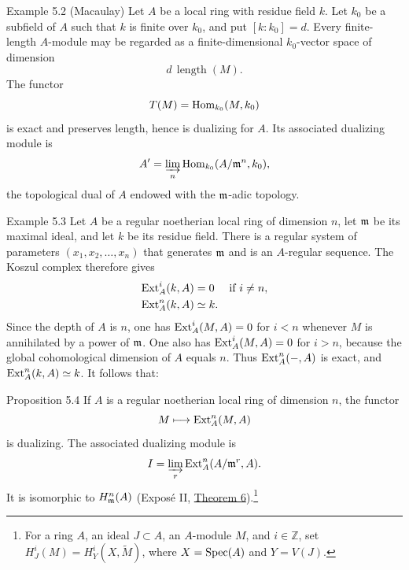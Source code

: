 \begin{sgastatement}{Example 5.2 (Macaulay)}
Let $A$ be a local ring with residue field $k$. Let $k_0$ be a subfield of
$A$ such that $k$ is finite over $k_0$, and put $[k:k_0]=d$. Every
finite-length $A$-module may be regarded as a finite-dimensional
$k_0$-vector space of dimension
\[
  d\,\operatorname{length}(M).
\]
The functor
\[
  T(M)=\operatorname{Hom}_{k_0}(M,k_0)
\]
is exact and preserves length, hence is dualizing for $A$. Its associated
dualizing module is
\[
  A'=\varinjlim_n\operatorname{Hom}_{k_0}(A/\mathfrak m^n,k_0),
\]
the topological dual of $A$ endowed with the $\mathfrak m$-adic topology.
\end{sgastatement}

\begin{sgastatement}{Example 5.3}
Let $A$ be a regular noetherian local ring of dimension $n$, let
$\mathfrak m$ be its maximal ideal, and let $k$ be its residue field. There is a
regular system of parameters $(x_1,x_2,\ldots,x_n)$ that generates
$\mathfrak m$ and is an $A$-regular sequence. The Koszul complex therefore gives
\[
\begin{aligned}
  \operatorname{Ext}_A^i(k,A)&=0 &&\text{if }i\ne n,\\
  \operatorname{Ext}_A^n(k,A)&\simeq k.
\end{aligned}
\]
Since the depth of $A$ is $n$, one has
$\operatorname{Ext}_A^i(M,A)=0$ for $i<n$ whenever
$M$ is annihilated by a power of $\mathfrak m$. One also has
$\operatorname{Ext}_A^i(M,A)=0$ for $i>n$, because the global cohomological dimension
of $A$ equals $n$. Thus $\operatorname{Ext}_A^n(-,A)$ is exact, and
$\operatorname{Ext}_A^n(k,A)\simeq k$. It follows that:
\end{sgastatement}

\begin{sgastatement}{Proposition 5.4}
If $A$ is a regular noetherian local ring of dimension $n$, the functor
\[
  M\longmapsto\operatorname{Ext}_A^n(M,A)
\]
is dualizing. The associated dualizing module is
\[
  I=\varinjlim_r\operatorname{Ext}_A^n(A/\mathfrak m^r,A).
\]
It is isomorphic to $H_{\mathfrak m}^n(A)$ (Expos\'e II, \hyperref[II.6]{Theorem 6}).\footnote{For
a ring $A$, an ideal $J\subset A$, an $A$-module $M$, and
$i\in\mathbb Z$, set $H_J^i(M)=H_Y^i(X,\widetilde M)$, where
$X=\operatorname{Spec}(A)$ and $Y=V(J)$.}
\end{sgastatement}


